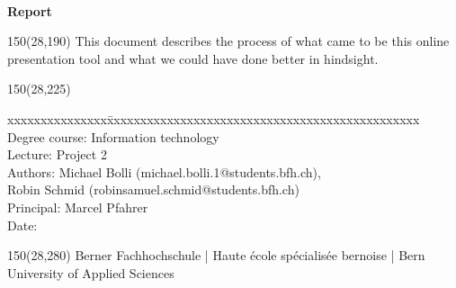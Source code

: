\documentclass[
	a4paper,					%
	10pt,							%
	twoside,					%
	notitlepage,			%
	parskip=half,			%
]{scrreprt}					%
\begin{document}
\begin{titlepage}
\begin{flushleft}
\vspace*{115mm}

\fontsize{26pt}{28pt}\selectfont
\titel 				\\							%
\vspace{2mm}

\fontsize{16pt}{20pt}\selectfont\vspace{0.3em}
\vspace{5mm}

\fontsize{10pt}{12pt}\selectfont
\textbf{Report} \\									%
\vspace{3mm}

\begin{textblock}{150}(28,190)
\fontsize{10pt}{12pt}\selectfont
This document describes the process of what came to be this online presentation tool and what we could have done better in hindsight. \\
\end{textblock}

\begin{textblock}{150}(28,225)
\fontsize{10pt}{17pt}\selectfont
\begin{tabbing}
xxxxxxxxxxxxxxx\=xxxxxxxxxxxxxxxxxxxxxxxxxxxxxxxxxxxxxxxxxxxxxxx \kill
Degree course:	\> Information technology	\\			%
Lecture:        \> Project 2 \\
Authors:        \> Michael Bolli (michael.bolli.1@students.bfh.ch), \\
\>Robin Schmid (robinsamuel.schmid@students.bfh.ch)		\\					%
Principal:	    \> Marcel Pfahrer		\\					%
Date:			\> \versiondate					\\		%
\end{tabbing}

\end{textblock}
\end{flushleft}

\begin{textblock}{150}(28,280)
\noindent
\color{bfhgrey}\fontsize{9pt}{10pt}\selectfont
Berner Fachhochschule | Haute école spécialisée bernoise | Bern University of Applied Sciences
\color{black}\selectfont
\end{textblock}


\end{titlepage}
\end{document}
